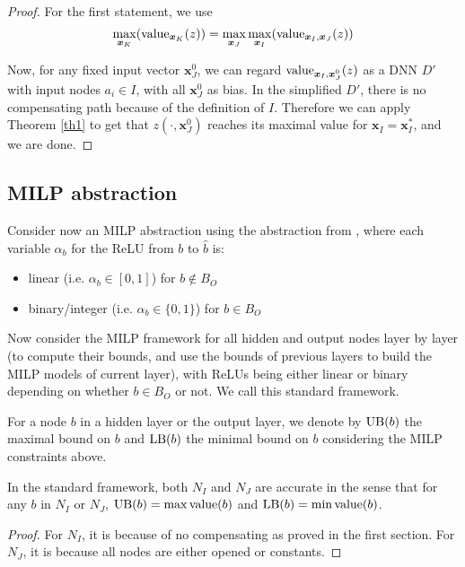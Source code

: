 				\begin{proof}
					For the first statement, we use 
					$$\max_{\boldsymbol{x}_K} ({\textrm{value}}_{\boldsymbol{x}_K}(z)) =\max_{\boldsymbol{x}_J} \max_{\boldsymbol{x}_I} ({\textrm{value}}_{\boldsymbol{x}_I,\boldsymbol{x}_J}(z))$$
					
					Now, for any fixed input vector $\boldsymbol{x}^0_J$, we can regard ${\textrm{value}}_{\boldsymbol{x}_I,\boldsymbol{x}^0_J}(z)$ as a DNN $D'$ with input nodes $a_i\in I$, with all $\boldsymbol{x}^0_J$ %
					as bias. In the simplified $D'$, there is no compensating path because of the definition of $I$. Therefore we can apply Theorem \ref{th1} to get that $z(\cdot,\boldsymbol{x}^0_J)$ reaches its maximal value for $\boldsymbol{x}_I=\boldsymbol{x}_I^*$, and we are done.
				\end{proof}
				
				
				\subsection{MILP abstraction}
				
				Consider now an MILP abstraction using the abstraction from \cite{MILP}, 
				where each variable $\alpha_b$ for the ReLU from $b$ to $\hat{b}$ is:
				\begin{itemize}
					\item linear  (i.e. $\alpha_b \in [0,1]$) for $b \notin B_{O}$
					\item binary/integer (i.e. $\alpha_b \in \{0,1\}$) for $b \in B_{O}$
				\end{itemize}
				
				Now consider the MILP framework for all hidden and output nodes layer by layer (to compute their bounds, and use the bounds of previous layers to build the MILP models of current layer), with ReLUs being either linear or binary depending on whether $b \in B_{O}$ or not. We call this standard framework.
				
				For a node $b$ in a hidden layer or the output layer, we denote by $\mathrm{UB}(b)$ the maximal bound on $b$ and $\mathrm{LB}(b)$ the minimal bound on $b$ considering the MILP constraints above.
				
				
				\begin{lemma}
					In the standard framework, both $N_I$ and $N_J$ are accurate in the sense that for any $b$ in $N_I$ or $N_J$, $\mathrm{UB}(b)=\max{\textrm{value}}(b)$ and $\mathrm{LB}(b)=\min{\textrm{value}}(b)$.
				\end{lemma}
				
				\begin{proof}
					For $N_I$, it is because of no compensating as proved in the first section. For $N_J$, it is because all nodes are either opened or constants.
				\end{proof}
				
